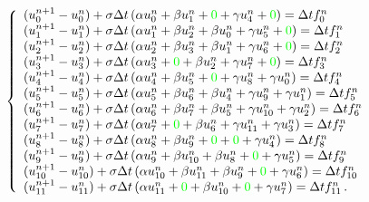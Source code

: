 \documentclass[11pt]{article}
\begin{document}
\begin{equation}
\left\{
\begin{array}{l}
(u^{n+1}_{0}-u^{n}_{0}) + \sigma\Delta t\left(\alpha u^{n}_{0} + \beta u^{n}_{1} +  {\color{green}0} +  \gamma u^{n}_{4} +  {\color{green}0}\right) = \Delta t f^{n}_{0} \\ 
(u^{n+1}_{1}-u^{n}_{1}) + \sigma\Delta t\left(\alpha u^{n}_{1} + \beta u^{n}_{2} +  \beta u^{n}_{0} +  \gamma u^{n}_{5} +  {\color{green}0}\right) = \Delta t f^{n}_{1} \\ 
(u^{n+1}_{2}-u^{n}_{2}) + \sigma\Delta t\left(\alpha u^{n}_{2} + \beta u^{n}_{3} +  \beta u^{n}_{1} +  \gamma u^{n}_{6} +  {\color{green}0}\right) = \Delta t f^{n}_{2} \\ 
(u^{n+1}_{3}-u^{n}_{3}) + \sigma\Delta t\left(\alpha u^{n}_{3} + {\color{green}0} +  \beta u^{n}_{2} +  \gamma u^{n}_{7} +  {\color{green}0}\right) = \Delta t f^{n}_{3} \\ 
(u^{n+1}_{4}-u^{n}_{4}) + \sigma\Delta t\left(\alpha u^{n}_{4} + \beta u^{n}_{5} +  {\color{green}0} +  \gamma u^{n}_{8} +  \gamma u^{n}_{0}\right) = \Delta t f^{n}_{4} \\ 
(u^{n+1}_{5}-u^{n}_{5}) + \sigma\Delta t\left(\alpha u^{n}_{5} + \beta u^{n}_{6} +  \beta u^{n}_{4} +  \gamma u^{n}_{9} +  \gamma u^{n}_{1}\right) = \Delta t f^{n}_{5} \\ 
(u^{n+1}_{6}-u^{n}_{6}) + \sigma\Delta t\left(\alpha u^{n}_{6} + \beta u^{n}_{7} +  \beta u^{n}_{5} +  \gamma u^{n}_{10} +  \gamma u^{n}_{2}\right) = \Delta t f^{n}_{6} \\ 
(u^{n+1}_{7}-u^{n}_{7}) + \sigma\Delta t\left(\alpha u^{n}_{7} + {\color{green}0} +  \beta u^{n}_{6} +  \gamma u^{n}_{11} +  \gamma u^{n}_{3}\right) = \Delta t f^{n}_{7} \\ 
(u^{n+1}_{8}-u^{n}_{8}) + \sigma\Delta t\left(\alpha u^{n}_{8} + \beta u^{n}_{9} +  {\color{green}0} +  {\color{green}0} +  \gamma u^{n}_{4}\right) = \Delta t f^{n}_{8} \\ 
(u^{n+1}_{9}-u^{n}_{9}) + \sigma\Delta t\left(\alpha u^{n}_{9} + \beta u^{n}_{10} +  \beta u^{n}_{8} +  {\color{green}0} +  \gamma u^{n}_{5}\right) = \Delta t f^{n}_{9} \\ 
(u^{n+1}_{10}-u^{n}_{10}) + \sigma\Delta t\left(\alpha u^{n}_{10} + \beta u^{n}_{11} +  \beta u^{n}_{9} +  {\color{green}0} +  \gamma u^{n}_{6}\right) = \Delta t f^{n}_{10} \\ 
(u^{n+1}_{11}-u^{n}_{11}) + \sigma\Delta t\left(\alpha u^{n}_{11} + {\color{green}0} +  \beta u^{n}_{10} +  {\color{green}0} +  \gamma u^{n}_{7}\right) = \Delta t f^{n}_{11}  \,.
\end{array}
\right.
\end{equation}
\end{document}

